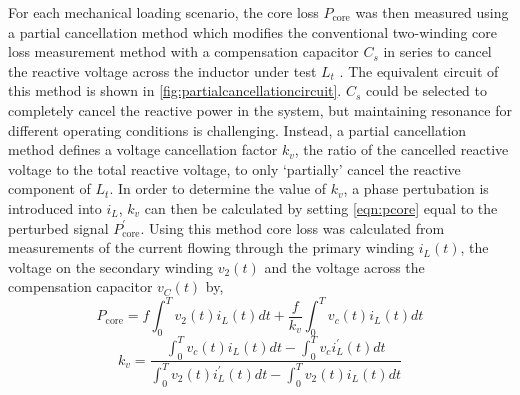 \documentclass[conference]{IEEEtran}
\begin{document}
For each mechanical loading scenario, the core loss $P_\text{core}$ was then measured using a partial cancellation method which modifies the conventional two-winding core loss measurement method with a compensation capacitor $C_s$ in series to cancel the reactive voltage across the inductor under test $L_t$ \cite{houNewHighFrequencyCore2017}. 
The equivalent circuit of this method is shown in \cref{fig:partialcancellationcircuit}.
$C_s$ could be selected to completely cancel the reactive power in the system, but maintaining resonance for different operating conditions is challenging. 
Instead, a partial cancellation method defines a voltage cancellation factor $k_v$, the ratio of the cancelled reactive voltage to the total reactive voltage, to only `partially' cancel the reactive component of $L_t$. 
In order to determine the value of $k_v$, a phase pertubation is introduced into $i_L$, $k_v$ can then be calculated by setting \cref{eqn:pcore} equal to the perturbed signal $P_\text{core}^\prime$.
Using this method core loss was calculated from measurements of the current flowing through the primary winding $i_L(t)$, the voltage on the secondary winding $v_2(t)$ and the voltage across the compensation capacitor $v_C(t)$ by, 
\begin{equation}
  P_\text{core} = f \int_0^T v_2(t)i_L(t)dt + \frac{f}{k_v} \int_0^T v_c(t)i_L(t) dt
  \label{eqn:pcore}
\end{equation}
\begin{equation}
  k_v = \frac{\int_0^T v_c(t)i_L(t)dt - \int_0^T v_ci_L^\prime(t)dt}{\int_0^T v_2(t) i_L^\prime(t) dt - \int_0^T v_2(t) i_L(t) dt}
  \label{eqn:kv}
\end{equation}
\end{document}
